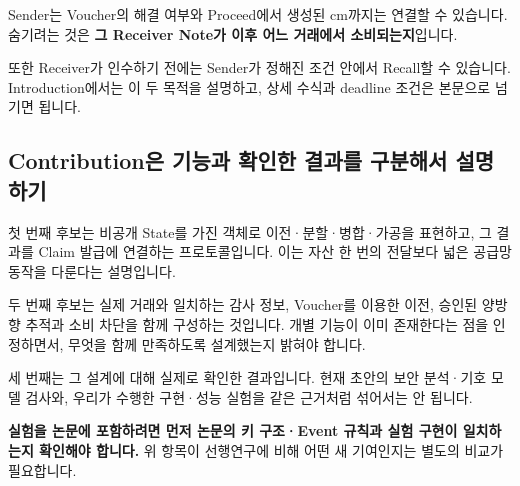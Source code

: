 Sender는 Voucher의 해결 여부와 Proceed에서 생성된 cm까지는 연결할 수 있습니다.
숨기려는 것은 \textbf{그 Receiver Note가 이후 어느 거래에서 소비되는지}입니다.

또한 Receiver가 인수하기 전에는 Sender가 정해진 조건 안에서 Recall할 수 있습니다.
Introduction에서는 이 두 목적을 설명하고, 상세 수식과 deadline 조건은 본문으로 넘기면 됩니다.

\subsection*{Contribution은 기능과 확인한 결과를 구분해서 설명하기}
첫 번째 후보는 비공개 State를 가진 객체로 이전·분할·병합·가공을 표현하고, 그 결과를 Claim 발급에 연결하는 프로토콜입니다.
이는 자산 한 번의 전달보다 넓은 공급망 동작을 다룬다는 설명입니다.

두 번째 후보는 실제 거래와 일치하는 감사 정보, Voucher를 이용한 이전, 승인된 양방향 추적과 소비 차단을 함께 구성하는 것입니다.
개별 기능이 이미 존재한다는 점을 인정하면서, 무엇을 함께 만족하도록 설계했는지 밝혀야 합니다.

세 번째는 그 설계에 대해 실제로 확인한 결과입니다.
현재 초안의 보안 분석·기호 모델 검사와, 우리가 수행한 구현·성능 실험을 같은 근거처럼 섞어서는 안 됩니다.

\textbf{실험을 논문에 포함하려면 먼저 논문의 키 구조·Event 규칙과 실험 구현이 일치하는지 확인해야 합니다.}
위 항목이 선행연구에 비해 어떤 새 기여인지는 별도의 비교가 필요합니다.

